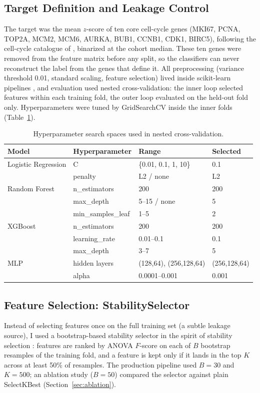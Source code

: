 \documentclass[11pt]{article}
\begin{document}
\subsection{Target Definition and Leakage Control}
The target was the mean $z$-score of ten core cell-cycle genes (MKI67, PCNA, TOP2A, MCM2, MCM6, AURKA, BUB1, CCNB1, CDK1, BIRC5), following the cell-cycle catalogue of \cite{whitfield2002}, binarized at the cohort median. These ten genes were removed from the feature matrix before any split, so the classifiers can never reconstruct the label from the genes that define it. All preprocessing (variance threshold 0.01, standard scaling, feature selection) lived inside scikit-learn pipelines \cite{pedregosa2011}, and evaluation used nested cross-validation: the inner loop selected features within each training fold, the outer loop evaluated on the held-out fold only. Hyperparameters were tuned by GridSearchCV inside the inner folds (Table~\ref{tab:hyper}).

\begin{table}[htbp]
\centering
\caption{Hyperparameter search spaces used in nested cross-validation.}
\label{tab:hyper}
\begin{tabular}{llll}
\toprule
\textbf{Model} & \textbf{Hyperparameter} & \textbf{Range} & \textbf{Selected} \\
\midrule
Logistic Regression & C & \{0.01, 0.1, 1, 10\} & 0.1 \\
 & penalty & L2 / none & L2 \\
Random Forest & n\_estimators & 200 & 200 \\
 & max\_depth & 5--15 / none & 5 \\
 & min\_samples\_leaf & 1--5 & 2 \\
XGBoost \cite{chen2016} & n\_estimators & 200 & 200 \\
 & learning\_rate & 0.01--0.1 & 0.1 \\
 & max\_depth & 3--7 & 5 \\
MLP & hidden layers & (128,64), (256,128,64) & (256,128,64) \\
 & alpha & 0.0001--0.001 & 0.001 \\
\bottomrule
\end{tabular}
\end{table}

\subsection{Feature Selection: StabilitySelector}
Instead of selecting features once on the full training set (a subtle leakage source), I used a bootstrap-based stability selector in the spirit of stability selection \cite{meinshausen2010}: features are ranked by ANOVA $F$-score on each of $B$ bootstrap resamples of the training fold, and a feature is kept only if it lands in the top $K$ across at least 50\% of resamples. The production pipeline used $B=30$ and $K=500$; an ablation study ($B=50$) compared the selector against plain SelectKBest (Section~\ref{sec:ablation}).
\end{document}
